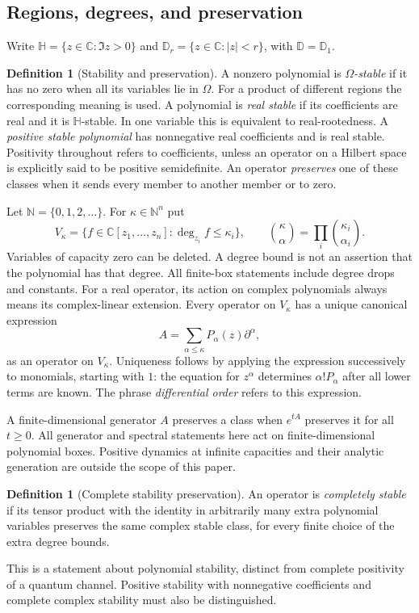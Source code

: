 \documentclass[reqno]{amsart}
\theoremstyle{definition}
\newtheorem{definition}[theorem]{Definition}
\theoremstyle{remark}
\newcommand{\C}{\mathbb C}
\newcommand{\N}{\mathbb N}
\newcommand{\D}{\mathbb D}
\newcommand{\HH}{\mathbb H}
\begin{document}
\subsection{Regions, degrees, and preservation}
Write $\HH=\{z\in\C:\Im z>0\}$ and $\D_r=\{z\in\C:|z|<r\}$,
with $\D=\D_1$.
\begin{definition}[Stability and preservation]\label{pre:stability}
A nonzero polynomial is \emph{$\Omega$-stable} if it
has no zero when all its variables lie in $\Omega$.
For a product of different regions the corresponding meaning is used.
A polynomial is \emph{real stable} if its coefficients are real and it is
$\HH$-stable. In one variable this is equivalent to real-rootedness.
A \emph{positive stable polynomial} has nonnegative real coefficients and
is real stable. Positivity throughout refers to coefficients, unless an
operator on a Hilbert space is explicitly said to be positive semidefinite.
An operator \emph{preserves} one of these classes when it sends every
member to another member or to zero.
\end{definition}

Let $\N=\{0,1,2,\ldots\}$. For $\kappa\in\N^n$ put
\[
 V_\kappa=\{f\in\C[z_1,\ldots,z_n]:\deg_{z_i}f\leq\kappa_i\},
 \qquad
 \binom{\kappa}{\alpha}=\prod_i\binom{\kappa_i}{\alpha_i}.
\]
Variables of capacity zero can be deleted. A degree bound is not an
assertion that the polynomial has that degree. All finite-box statements
include degree drops and constants. For a real operator, its action on
complex polynomials always means its complex-linear extension.
Every operator on $V_\kappa$ has a unique canonical expression
\begin{equation}\label{pre:normal-order}
 A=\sum_{\alpha\leq\kappa}P_\alpha(z)\partial^\alpha,
\end{equation}
as an operator on $V_\kappa$. Uniqueness follows by applying the expression
successively to monomials, starting with $1$: the equation for $z^\alpha$
determines $\alpha!P_\alpha$ after all lower terms are known. The phrase
\emph{differential order} refers to this expression.

A finite-dimensional generator $A$ preserves a class when $e^{tA}$
preserves it for all $t\geq0$. All generator and spectral statements here act on finite-dimensional
polynomial boxes. Positive dynamics at infinite capacities and their
analytic generation are outside the scope of this paper.

\begin{definition}[Complete stability preservation]\label{pre:complete}
An operator is \emph{completely stable} if its tensor product with the
identity in arbitrarily many extra polynomial variables preserves the
same complex stable class, for every finite choice of the extra degree
bounds.
\end{definition}
This is a statement about polynomial
stability, distinct from complete positivity of a quantum channel.
Positive stability with nonnegative coefficients and complete complex
stability must also be distinguished.
\end{document}
